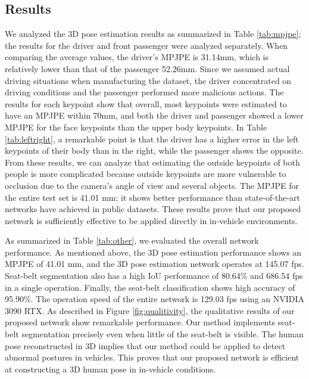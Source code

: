 \documentclass[letterpaper]{article} %
\begin{document}
\subsection{Results}
We analyzed the 3D pose estimation results as summarized in Table \ref{tab:mpjpe}; the results for the driver and front passenger were analyzed separately. When comparing the average values, the driver's MPJPE is 31.14mm, which is relatively lower than that of the passenger 52.26mm. Since we assumed actual driving situations when manufacturing the dataset, the driver concentrated on driving conditions and the passenger performed more malicious actions. The results for each keypoint show that overall, most keypoints were estimated to have an MPJPE within 70mm, and both the driver and passenger showed a lower MPJPE for the face keypoints than the upper body keypoints. In Table \ref{tab:leftright}, a remarkable point is that the driver has a higher error in the left keypoints of their body than in the right, while the passenger shows the opposite. From these results, we can analyze that estimating the outside keypoints of both people is more complicated because outside keypoints are more vulnerable to occlusion due to the camera's angle of view and several objects. The MPJPE for the entire test set is 41.01 mm; it shows better performance than state-of-the-art networks have achieved in public datasets. These results prove that our proposed network is sufficiently effective to be applied directly in in-vehicle environments.

As summarized in Table \ref{tab:other}, we evaluated the overall network performance. As mentioned above, the 3D pose estimation performance shows an MPJPE of 41.01 mm, and the 3D pose estimation network operates at 145.07 fps. Seat-belt segmentation also has a high IoU performance of 80.64\% and 686.54 fps in a single operation. Finally, the seat-belt classification shows high accuracy of 95.90\%. The operation speed of the entire network is 129.03 fps using an NVIDIA 3090 RTX. As described in Figure \ref{fig:qualitivity}, the qualitative results of our proposed network show remarkable performance. Our method implements seat-belt segmentation precisely even when little of the seat-belt is visible. The human pose reconstructed in 3D implies that our method could be applied to detect abnormal postures in vehicles. This proves that our proposed network is efficient at constructing a 3D human pose in in-vehicle conditions.

\vspace{-2.67mm}
\end{document}
